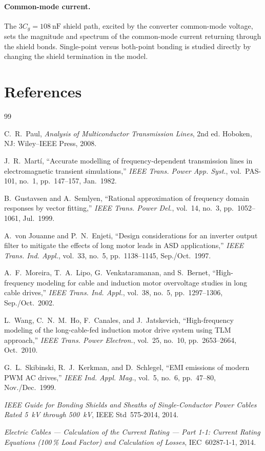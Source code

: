 \documentclass[11pt,a4paper]{article}
\begin{document}
\paragraph{Common-mode current.} The $3C_g=108\ \mathrm{nF}$ shield path, excited
by the converter common-mode voltage, sets the magnitude and spectrum of the
common-mode current returning through the shield bonds. Single-point versus
both-point bonding is studied directly by changing the shield termination in the
model.

\section*{References}
\begin{thebibliography}{99}

 C.~R.~Paul, \emph{Analysis of Multiconductor Transmission Lines},
2nd ed. Hoboken, NJ: Wiley--IEEE Press, 2008.

 J.~R.~Mart\'i, ``Accurate modelling of frequency-dependent
transmission lines in electromagnetic transient simulations,'' \emph{IEEE Trans.
Power App. Syst.}, vol.~PAS-101, no.~1, pp.~147--157, Jan.~1982.

 B.~Gustavsen and A.~Semlyen, ``Rational approximation of
frequency domain responses by vector fitting,'' \emph{IEEE Trans. Power Del.},
vol.~14, no.~3, pp.~1052--1061, Jul.~1999.

 A.~von Jouanne and P.~N.~Enjeti, ``Design considerations for
an inverter output filter to mitigate the effects of long motor leads in ASD
applications,'' \emph{IEEE Trans. Ind. Appl.}, vol.~33, no.~5, pp.~1138--1145,
Sep./Oct.~1997.

 A.~F.~Moreira, T.~A.~Lipo, G.~Venkataramanan, and S.~Bernet,
``High-frequency modeling for cable and induction motor overvoltage studies in
long cable drives,'' \emph{IEEE Trans. Ind. Appl.}, vol.~38, no.~5,
pp.~1297--1306, Sep./Oct.~2002.

 L.~Wang, C.~N.~M.~Ho, F.~Canales, and J.~Jatskevich,
``High-frequency modeling of the long-cable-fed induction motor drive system using
TLM approach,'' \emph{IEEE Trans. Power Electron.}, vol.~25, no.~10,
pp.~2653--2664, Oct.~2010.

 G.~L.~Skibinski, R.~J.~Kerkman, and D.~Schlegel, ``EMI emissions
of modern PWM AC drives,'' \emph{IEEE Ind. Appl. Mag.}, vol.~5, no.~6,
pp.~47--80, Nov./Dec.~1999.

 \emph{IEEE Guide for Bonding Shields and Sheaths of
Single-Conductor Power Cables Rated 5~kV through 500~kV}, IEEE Std~575-2014, 2014.

 \emph{Electric Cables --- Calculation of the Current Rating ---
Part 1-1: Current Rating Equations (100\,\% Load Factor) and Calculation of
Losses}, IEC~60287-1-1, 2014.

\end{thebibliography}
\end{document}
